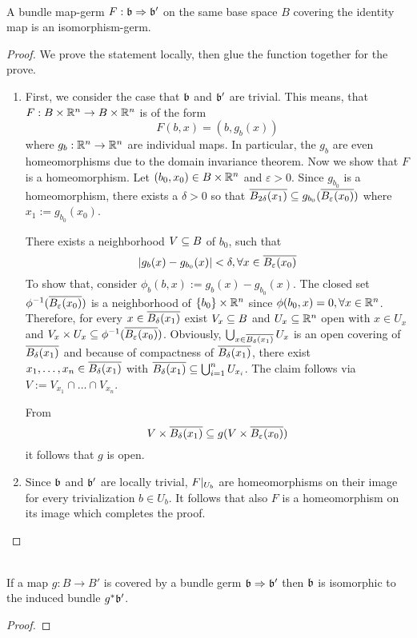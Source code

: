  \\
A bundle map-germ $F: \mathfrak{b} \Rightarrow \mathfrak{b}'$ on the same base space $B$ covering the identity map is an isomorphism-germ.
\begin{proof}
We prove the statement locally, then glue the function together for the prove.
\begin{enumerate}
    \item
    First, we consider the case that $\mathfrak{b}$ and $\mathfrak{b}'$ are trivial.
    This means, that $F: B \times \mathbb{R}^n \to B \times \mathbb{R}^n$ is of the form
    \[ F(b, x) = (b, g_b(x)) \]
    where $g_b: \mathbb{R}^n \to \mathbb{R}^n$ are individual maps.
    In particular, the $g_b$ are even homeomorphisms due to the domain invariance theorem.
    Now we show that $F$ is a homeomorphism.
    Let $(b_0, x_0) \in B \times \mathbb{R}^n$ and $\varepsilon > 0$.
    Since $g_{b_0}$ is a homeomorphism, there exists a $\delta > 0$ so that
    $\clball[2\delta][x_1] \sub g_{b_0}(\clball[\varepsilon][x_0])$ where $x_1 := g_{b_0}(x_0)$.

    There exists a neighborhood $V \subseteq B$ of $b_0$, such that
    \[ \abs{g_b(x) - g_{b_0}(x)} < \delta, \forall x \in \clball[\varepsilon][x_0] \]
    To show that, consider $\phi_b(b, x) := g_b(x) - g_{b_0}(x)$.
    The closed set $\phi^{-1}(\clball[\varepsilon][x_0])$ is a neighborhood of $\{b_0\} \times \mathbb{R}^n$ since
    $\phi(b_0, x) = 0, \forall x \in \mathbb{R}^n$.
    Therefore, for every $x \in \clball[\delta][x_1]$ exist $V_x \subseteq B$ and $U_x \subseteq \mathbb{R}^n$ open with $x \in U_x$ and $V_x \times U_x \sub \phi^{-1}(\clball[\varepsilon][x_0])$.
    Obviously, $\bigcup_{x \in \clball[\delta][x_1]} U_x$ is an open covering of $\clball[\delta][x_1]$ and because of compactness of $\clball[\delta][x_1]$, there
    exist $x_1, \dots, x_n \in \clball[\delta][x_1]$ with $\clball[\delta][x_1] \sub \bigcup_{i = 1}^{n} U_{x_i}$.
    The claim follows via $V := V_{x_1} \cap \dots \cap V_{x_n}$.

    From
    \[ V \times \clball[\delta][x_1] \sub g(V \times \clball[\varepsilon][x_0]) \]
    it follows that $g$ is open.
    \item
    Since $\mathfrak{b}$ and $\mathfrak{b}'$ are locally trivial, $F\vert_{U_b}$ are homeomorphisms on their image for every trivialization $b \in U_b$.
    It follows that also $F$ is a homeomorphism on its image which completes the proof.
\end{enumerate}
\end{proof}

 \\
If a map $g: B \to B'$ is covered by a bundle germ $\mathfrak{b} \Rightarrow \mathfrak{b}'$ then $\mathfrak{b}$ is isomorphic to the induced bundle $g^*\mathfrak{b}'$.
\begin{proof}
\end{proof}